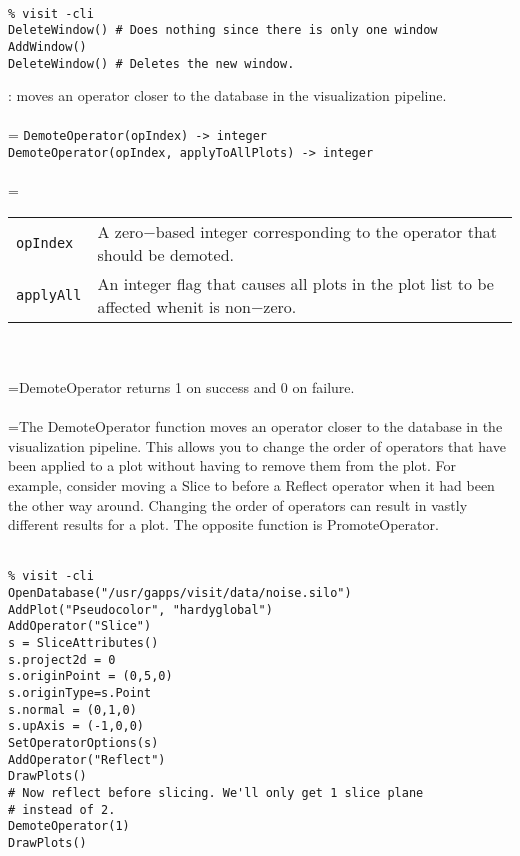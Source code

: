 \documentclass[10pt,a4paper]{report}
\begin{document}
\\[-6mm]
\begin{verbatim}% visit -cli
DeleteWindow() # Does nothing since there is only one window
AddWindow()
DeleteWindow() # Deletes the new window.
\end{verbatim}
\newpage


{}
: moves an operator closer to the database in the visualization pipeline.\\[-3mm]

 \\ 
\hangindent=\parindent 
\verb!DemoteOperator(opIndex) -> integer!\\ 
\verb!DemoteOperator(opIndex, applyToAllPlots) -> integer!\\ [-3mm]

 \\ 
\hangindent=\parindent 
\begin{tabular}{lp{9cm}}
\verb!opIndex! & A zero$-$based integer corresponding to the operator that should be demoted. \\
\verb!applyAll! & An integer flag that causes all plots in the plot list to be affected whenit is non$-$zero. \\
\end{tabular} \\[-2mm]


 \\ 
\hangindent=\parindent DemoteOperator returns 1 on success and 0 on failure. \\[-3mm] 

 \\ 
\hangindent=\parindent The DemoteOperator function moves an operator closer to the database in the visualization pipeline. This allows you to change the order of operators that have been applied to a plot without having to remove them from the plot. For example, consider moving a Slice to before a Reflect operator when it had been the other way around. Changing the order of operators can result in vastly different results for a plot. The opposite function is PromoteOperator. \\[-3mm] 

\\[-6mm]
\begin{verbatim}% visit -cli
OpenDatabase("/usr/gapps/visit/data/noise.silo")
AddPlot("Pseudocolor", "hardyglobal")
AddOperator("Slice")
s = SliceAttributes()
s.project2d = 0
s.originPoint = (0,5,0)
s.originType=s.Point
s.normal = (0,1,0)
s.upAxis = (-1,0,0)
SetOperatorOptions(s)
AddOperator("Reflect")
DrawPlots()
# Now reflect before slicing. We'll only get 1 slice plane
# instead of 2.
DemoteOperator(1)
DrawPlots()
\end{verbatim}
\newpage
\end{document}

